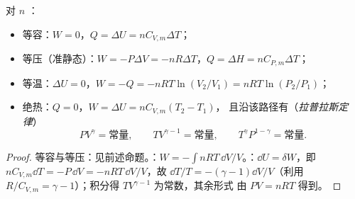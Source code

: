 \begin{proposition}[四种典型过程]\label{prop:b1:first-law:transformations}
对 $n$ ：
\begin{itemize}
  \item 等容：$W = 0$，$Q = \Delta U = nC_{V,m}\Delta T$；
  \item 等压（准静态）：$W = -P\Delta V = -nR\Delta T$，$Q = \Delta H =
        nC_{P,m}\Delta T$；
  \item 等温：$\Delta U = 0$，$W = -Q = -nRT\ln(V_2/V_1) =
        nRT\ln(P_2/P_1)$；
  \item 绝热：$Q = 0$，$W = \Delta U = nC_{V,m}(T_2 - T_1)$，
        且沿该路径有（\emph{拉普拉斯定律}）
        \[
        PV^\gamma = \text{常量}, \qquad TV^{\gamma - 1} = \text{常量}, \qquad
        T^\gamma P^{1 - \gamma} = \text{常量} .
        \]
\end{itemize}
\end{proposition}

\begin{proof}
等容与等压：见前述命题。：$W =
-\int nRT\,\dd V/V$。：$\dd U = \delta W$，即 $nC_{V,m}\dd T =
-P\,\dd V = -nRT\,\dd V/V$，故 $\dd T/T = -(\gamma - 1)\dd V/V$（利用
$R/C_{V,m} = \gamma - 1$）；积分得 $TV^{\gamma - 1}$ 为常数，其余形式
由 $PV = nRT$ 得到。
\end{proof}

